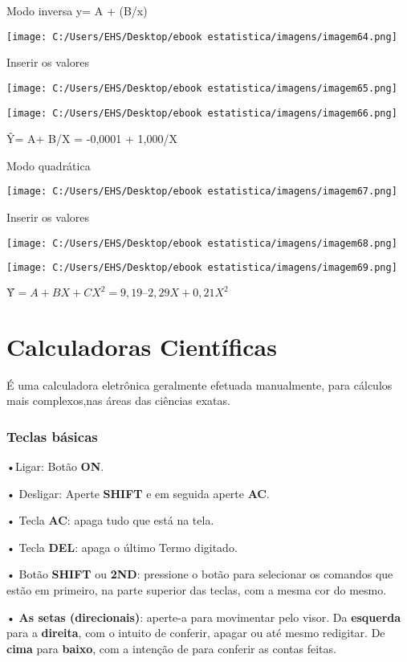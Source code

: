 \documentclass[]{book}
\begin{document}
Modo inversa y= A + (B/x)

\texttt{[image: C:/Users/EHS/Desktop/ebook estatistica/imagens/imagem64.png]}

Inserir os valores

\texttt{[image: C:/Users/EHS/Desktop/ebook estatistica/imagens/imagem65.png]}

\texttt{[image: C:/Users/EHS/Desktop/ebook estatistica/imagens/imagem66.png]}

Ŷ= A+ B/X = -0,0001 + 1,000/X

Modo quadrática

\texttt{[image: C:/Users/EHS/Desktop/ebook estatistica/imagens/imagem67.png]}

Inserir os valores

\texttt{[image: C:/Users/EHS/Desktop/ebook estatistica/imagens/imagem68.png]}

\texttt{[image: C:/Users/EHS/Desktop/ebook estatistica/imagens/imagem69.png]}

\(Ŷ= A+ BX + CX^{2} = 9,19 – 2,29X + 0,21X^{2}\)

\hypertarget{calculadoras-cientificas}{%
\chapter{Calculadoras Científicas}\label{calculadoras-cientificas}}

É uma calculadora eletrônica geralmente efetuada manualmente, para cálculos mais complexos,nas áreas das ciências exatas.

\hypertarget{teclas-basicas}{%
\subsection{Teclas básicas}\label{teclas-basicas}}

•Ligar: Botão \textbf{ON}.

• Desligar: Aperte \textbf{SHIFT} e em seguida aperte \textbf{AC}.

• Tecla \textbf{AC}: apaga tudo que está na tela.

• Tecla \textbf{DEL}: apaga o último Termo digitado.

• Botão \textbf{SHIFT} ou \textbf{2ND}: pressione o botão para selecionar os comandos que estão em primeiro, na parte superior das teclas, com a mesma cor do mesmo.

• \textbf{As setas (direcionais)}: aperte-a para movimentar pelo visor. Da \textbf{esquerda} para a \textbf{direita}, com o intuito de conferir, apagar ou até mesmo redigitar. De \textbf{cima} para \textbf{baixo}, com a intenção de para conferir as contas feitas.
\end{document}
